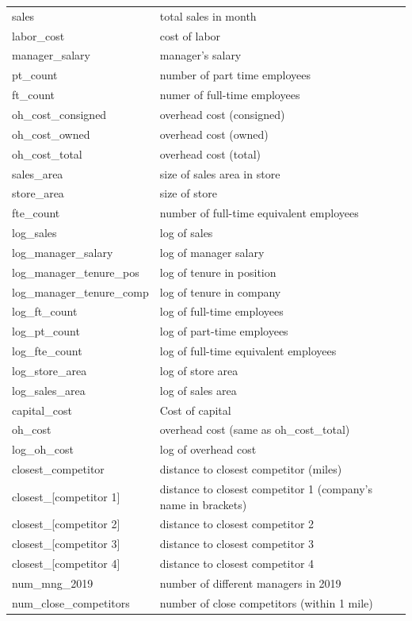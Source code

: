 \documentclass[
]{article}
\begin{document}
\begin{longtable}{ll}
sales & total sales in month  \\
labor\_cost & cost of labor  \\
manager\_salary & manager's salary  \\
pt\_count & number of part time employees \\
ft\_count & numer of full-time employees  \\
oh\_cost\_consigned & overhead cost (consigned)  \\
oh\_cost\_owned & overhead cost (owned)  \\
oh\_cost\_total & overhead cost (total)  \\
sales\_area & size of sales area in store  \\
store\_area & size of store  \\
fte\_count & number of full-time equivalent employees  \\
log\_sales & log of sales  \\
log\_manager\_salary & log of manager salary  \\
log\_manager\_tenure\_pos & log of tenure in position  \\
log\_manager\_tenure\_comp & log of tenure in company  \\
log\_ft\_count & log of full-time employees  \\
log\_pt\_count & log of part-time employees  \\
log\_fte\_count & log of full-time equivalent employees  \\
log\_store\_area & log of store area  \\
log\_sales\_area & log of sales area  \\
capital\_cost & Cost of capital  \\
oh\_cost & overhead cost (same as oh\_cost\_total)  \\
log\_oh\_cost & log of overhead cost  \\
closest\_competitor & distance to closest competitor (miles)  \\
closest\_[competitor 1] & distance to closest competitor 1 (company's name in brackets)  \\
closest\_[competitor 2] & distance to closest competitor 2  \\
closest\_[competitor 3] & distance to closest competitor 3  \\
closest\_[competitor 4] & distance to closest competitor 4  \\
num\_mng\_2019 & number of different managers in 2019  \\
num\_close\_competitors & number of close competitors (within 1 mile)  \\

\end{longtable}
\end{document}
